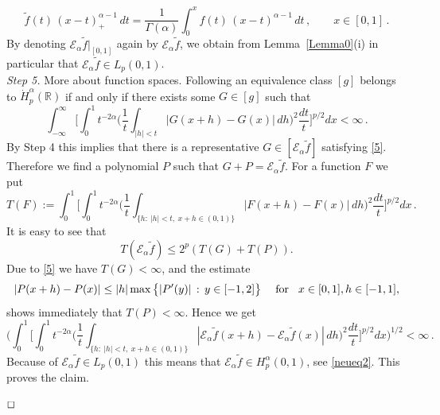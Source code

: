 \documentclass[12pt]{article}
\newenvironment{proof}{\begin{trivlist}
    \item[\hskip\labelsep{\it Proof.}]}{$\hfill\Box$\end{trivlist}}
\newcommand{\RR}{\mathbb{R}}
\newcommand{\HH}{\mathcal{H}}
\newcommand{\ce}{{\mathcal E}}
\newcommand{\re}{\mathbb{R}}
\begin{document}
\begin{proof}
\[\tilde{f}(t) \, (x-t)_+^{\alpha-1}\, dt
= \frac{1}{\Gamma (\alpha)} \int_{0}^x f(t) \, (x-t)^{\alpha-1}\, dt
\, , \qquad x \in [0,1] \, .
\] 
By denoting $\ce_\alpha \tilde{f}|_{[0,1]}$ again by $\ce_\alpha \tilde{f}$, we obtain
from Lemma~\ref{Lemma0}(i)
in particular that $\ce_\alpha \tilde{f} \in L_p (0,1)$.
\\
{\em Step 5.} More about function spaces.
Following \cite[Thm.~2.5.11]{Tri83} an equivalence  class $[g]$ belongs to $\dot{H}^{\alpha}_p(\re)$
if and only if there exists some $G \in [g]$ such that
\begin{equation}\label{5}
\int_{-\infty}^\infty \Big[ \int_0^1   t^{-2\alpha} \Big( \frac 1t \int_{|h|<t} |G(x+h)-G(x)|\, dh\Big)^2 \frac{dt}{t}\Big]^{p/2} dx  <\infty\, .
\end{equation}
By Step 4 this implies that there is a representative $G \in [\ce_\alpha \tilde{f}]$ satisfying \eqref{5}.
Therefore we find a polynomial $P$ such that $G + P = \ce_\alpha \tilde{f}$.
For a function $F$ we put
\[
T(F) := \int_{0}^1 \Big[ \int_0^1   t^{-2\alpha} \Big( \frac 1t \int_{\{h : \: |h|<t, \: x+h \in (0,1)\} } 
|F(x+h)-F(x)|\, dh\Big)^2 \frac{dt}{t}\Big]^{p/2} dx \, .
\]
It is easy to see that 
$$T(\ce_\alpha \tilde{f}) \le 2^p \left( T(G) + T(P) \right).$$
Due to \eqref{5} we have $T(G) < \infty$, and the estimate
$$|P(x+h)-P(x)| \le |h| \max \big\{ |P'(y)| \,:\, y\in [-1,2] \big\} \hspace{3ex}\text{for}\hspace{2ex} x\in [0,1], h\in [-1,1],$$ 
shows immediately that $T(P)< \infty$. Hence we get
\[
\bigg(\int_{0}^1 \Big[ \int_0^1   t^{-2\alpha} \Big( \frac 1t \int_{\{h : \: |h|<t, \: x+h \in (0,1)\} } 
|\ce_\alpha \tilde{f}(x+h)-\ce_\alpha \tilde{f}(x)|\, dh\Big)^2 \frac{dt}{t}\Big]^{p/2} dx \bigg)^{1/2} <\infty\, .
\]
Because of $\ce_\alpha \tilde{f} \in L_p (0,1)$ this means  that 
 $\ce_\alpha \tilde{f}  \in H^\alpha_p (0,1)$, see \eqref{neueq2}.
This proves the claim.
%
\end{proof}
\end{document}
